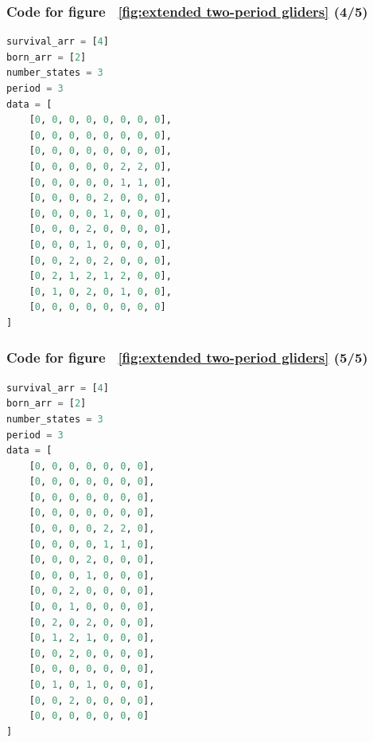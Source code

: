 \documentclass[12pt]{article}
\numberwithin{figure}{section} %
\begin{document}
\noindent\begin{minipage}{.5\textwidth}
\subsubsection{Code for figure ~\ref{fig:extended two-period gliders} (4/5)}
\label{subsubsection:extended two-period gliders(4/5)}
\begin{lstlisting}[language = Python]
survival_arr = [4]
born_arr = [2]
number_states = 3
period = 3 
data = [
    [0, 0, 0, 0, 0, 0, 0, 0],
    [0, 0, 0, 0, 0, 0, 0, 0],
    [0, 0, 0, 0, 0, 0, 0, 0],
    [0, 0, 0, 0, 0, 2, 2, 0],
    [0, 0, 0, 0, 0, 1, 1, 0],
    [0, 0, 0, 0, 2, 0, 0, 0],
    [0, 0, 0, 0, 1, 0, 0, 0],
    [0, 0, 0, 2, 0, 0, 0, 0],
    [0, 0, 0, 1, 0, 0, 0, 0],
    [0, 0, 2, 0, 2, 0, 0, 0],
    [0, 2, 1, 2, 1, 2, 0, 0],
    [0, 1, 0, 2, 0, 1, 0, 0],
    [0, 0, 0, 0, 0, 0, 0, 0]
]

\end{lstlisting}
\end{minipage}\hfill
\begin{minipage}{.45\textwidth}
\subsubsection{Code for figure ~\ref{fig:extended two-period gliders} (5/5)}
\label{subsubsection:extended two-period gliders(5/5)}
\begin{lstlisting}[language = Python]
survival_arr = [4]
born_arr = [2]
number_states = 3
period = 3
data = [
    [0, 0, 0, 0, 0, 0, 0],
    [0, 0, 0, 0, 0, 0, 0],
    [0, 0, 0, 0, 0, 0, 0],
    [0, 0, 0, 0, 0, 0, 0],
    [0, 0, 0, 0, 2, 2, 0],
    [0, 0, 0, 0, 1, 1, 0],
    [0, 0, 0, 2, 0, 0, 0],
    [0, 0, 0, 1, 0, 0, 0],
    [0, 0, 2, 0, 0, 0, 0],
    [0, 0, 1, 0, 0, 0, 0],
    [0, 2, 0, 2, 0, 0, 0],
    [0, 1, 2, 1, 0, 0, 0],
    [0, 0, 2, 0, 0, 0, 0],
    [0, 0, 0, 0, 0, 0, 0],
    [0, 1, 0, 1, 0, 0, 0],
    [0, 0, 2, 0, 0, 0, 0],
    [0, 0, 0, 0, 0, 0, 0]
]
\end{lstlisting}
\end{minipage}
\end{document}
